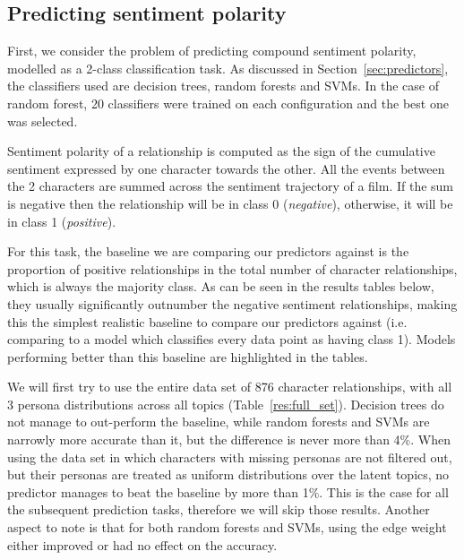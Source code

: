 \documentclass[bsc,frontabs,singlespacing,parskip, twoside]{infthesis}
\begin{document}
\subsection{Predicting sentiment polarity}
First, we consider the problem of predicting compound sentiment polarity, modelled as a 2-class classification task. As discussed in Section~\ref{sec:predictors}, the classifiers used are decision trees, random forests and SVMs. In the case of random forest, 20 classifiers were trained on each configuration and the best one was selected.

Sentiment polarity of a relationship is computed as the sign of the cumulative sentiment expressed by one character towards the other. All the events between the 2 characters are summed across the sentiment trajectory of a film. If the sum is negative then the relationship will be in class 0 (\textit{negative}), otherwise, it will be in class 1 (\textit{positive}).

For this task, the baseline we are comparing our predictors against is the proportion of positive relationships in the total number of character relationships, which is always the majority class. As can be seen in the results tables below, they usually significantly outnumber the negative sentiment relationships, making this the simplest realistic baseline to compare our predictors against (i.e. comparing to a model which classifies every data point as having class 1). Models performing better than this baseline are highlighted in the tables.

We will first try to use the entire data set of 876 character relationships, with all 3 persona distributions across all topics (Table~\ref{res:full_set}). Decision trees do not manage to out-perform the baseline, while random forests and SVMs are narrowly more accurate than it, but the difference is never more than 4\%. When using the data set in which characters with missing personas are not filtered out, but their personas are treated as uniform distributions over the latent topics, no predictor manages to beat the baseline by more than 1\%. This is the case for all the subsequent prediction tasks, therefore we will skip those results. Another aspect to note is that for both random forests and SVMs, using the edge weight either improved or had no effect on the accuracy.
\end{document}
